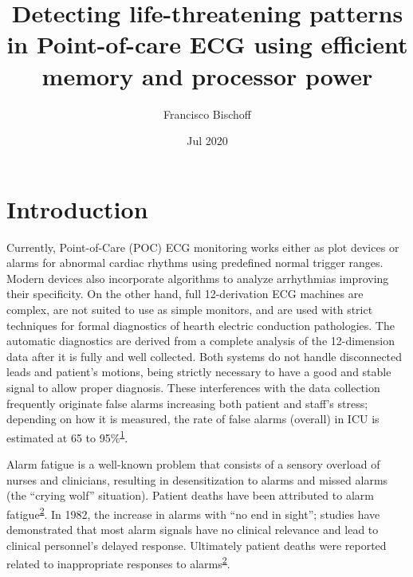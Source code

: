 \documentclass[12pt,twoside]{fmupthesis}
\title{Detecting life-threatening patterns in Point-of-care ECG using efficient memory and processor power}
\author{Francisco Bischoff}
\date{Jul 2020}
\begin{document}
\maketitle

\frontmatter %
\pagestyle{empty} %



\hypersetup{linkcolor=black}
\setcounter{secnumdepth}{2}
\setcounter{tocdepth}{2}
\tableofcontents

\listoftables

\listoffigures



\mainmatter %
\pagestyle{fancyplain} %

\hypertarget{introduction}{%
\chapter*{Introduction}\label{introduction}}

Currently, Point-of-Care (POC) ECG monitoring works either as plot devices or alarms for abnormal
cardiac rhythms using predefined normal trigger ranges. Modern devices also incorporate algorithms
to analyze arrhythmias improving their specificity. On the other hand, full 12-derivation ECG
machines are complex, are not suited to use as simple monitors, and are used with strict techniques
for formal diagnostics of hearth electric conduction pathologies. The automatic diagnostics are
derived from a complete analysis of the 12-dimension data after it is fully and well collected. Both
systems do not handle disconnected leads and patient's motions, being strictly necessary to have a
good and stable signal to allow proper diagnosis. These interferences with the data collection
frequently originate false alarms increasing both patient and staff's stress; depending on how it is
measured, the rate of false alarms (overall) in ICU is estimated at 65 to 95\%\textsuperscript{\protect\hyperlink{ref-donchin2002}{1}}.

Alarm fatigue is a well-known problem that consists of a sensory overload of nurses and clinicians,
resulting in desensitization to alarms and missed alarms (the ``crying wolf'' situation). Patient
deaths have been attributed to alarm fatigue\textsuperscript{\protect\hyperlink{ref-sendelbach2013}{2}}. In 1982, the increase in alarms with
``no end in sight''; studies have demonstrated that most alarm signals have no clinical relevance and
lead to clinical personnel's delayed response. Ultimately patient deaths were reported related to
inappropriate responses to alarms\textsuperscript{\protect\hyperlink{ref-sendelbach2013}{2}}.
\end{document}
